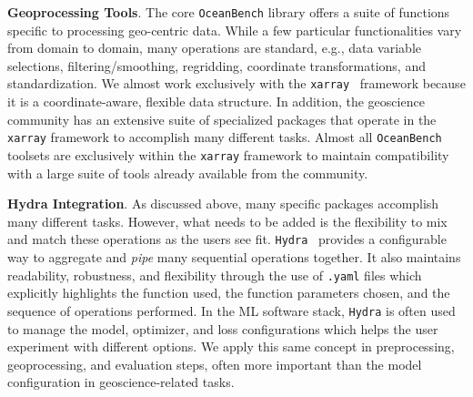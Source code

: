 \textbf{Geoprocessing Tools}. 
The core \texttt{OceanBench} library offers a suite of functions specific to processing geo-centric data. 
While a few particular functionalities vary from domain to domain, many operations are standard, e.g., data variable selections, filtering/smoothing, regridding, coordinate transformations, and standardization. 
We almost work exclusively with the \texttt{xarray}~\cite{XARRAY} framework because it is a coordinate-aware, flexible data structure. 
In addition, the geoscience community has an extensive suite of specialized packages that operate in the \texttt{xarray} framework to accomplish many different tasks. 
Almost all \texttt{OceanBench} toolsets are exclusively within the \texttt{xarray} framework to maintain compatibility with a large suite of tools already available from the community.




\textbf{Hydra Integration}. 
As discussed above, many specific packages accomplish many different tasks. 
However, what needs to be added is the flexibility to mix and match these operations as the users see fit. 
\texttt{Hydra}~\cite{Hydra} provides a configurable way to aggregate and \textit{pipe} many sequential operations together. 
It also maintains readability, robustness, and flexibility through the use of \texttt{.yaml} files which explicitly highlights the function used, the function parameters chosen, and the sequence of operations performed. 
In the ML software stack, \texttt{Hydra} is often used to manage the model, optimizer, and loss configurations which helps the user experiment with different options. 
We apply this same concept in preprocessing, geoprocessing, and evaluation steps, often more important than the model configuration in geoscience-related tasks.  

